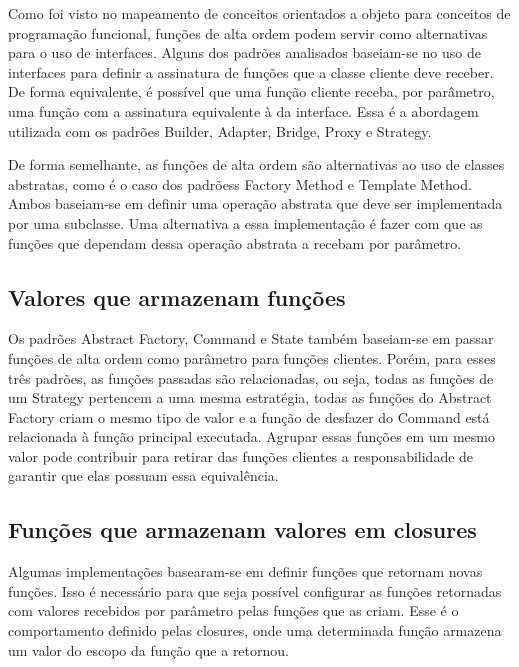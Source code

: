 Como foi visto no mapeamento de conceitos orientados 
a objeto para conceitos de programação funcional, 
funções de alta ordem podem servir como alternativas 
para o uso de interfaces. Alguns dos padrões analisados 
baseiam-se no uso de interfaces para definir a assinatura 
de funções que a classe cliente deve receber. De forma 
equivalente, é possível que uma função cliente receba, 
por parâmetro, uma função com a assinatura equivalente 
à da interface. Essa é a abordagem utilizada com os 
padrões Builder, Adapter, Bridge, Proxy e Strategy. 

De forma semelhante, as funções de alta ordem são 
alternativas ao uso de 
classes abstratas, como é o caso dos padrõess 
Factory Method e Template Method. Ambos baseiam-se 
em definir uma operação abstrata que deve ser 
implementada por uma subclasse. Uma alternativa 
a essa implementação é fazer com que as funções 
que dependam dessa operação abstrata a recebam 
por parâmetro.

\subsection{Valores que armazenam funções}

Os padrões Abstract Factory, Command e 
State também baseiam-se em passar funções de 
alta ordem como parâmetro para funções clientes. 
Porém, para esses três padrões, as funções 
passadas são relacionadas, ou seja, 
todas as funções de um Strategy pertencem a uma mesma 
estratégia, todas as funções do Abstract Factory criam 
o mesmo tipo de valor e a função de desfazer do 
Command está relacionada à função principal executada. 
Agrupar essas funções em um mesmo valor pode 
contribuir para retirar das funções clientes a 
responsabilidade de garantir que elas possuam 
essa equivalência.

\subsection{Funções que armazenam valores em closures}

Algumas implementações basearam-se em definir funções 
que retornam novas funções. Isso é necessário para 
que seja possível configurar as funções retornadas 
com valores recebidos por parâmetro pelas funções 
que as criam. Esse é o comportamento definido pelas 
closures, onde uma determinada função armazena 
um valor do escopo da função que a retornou. 

